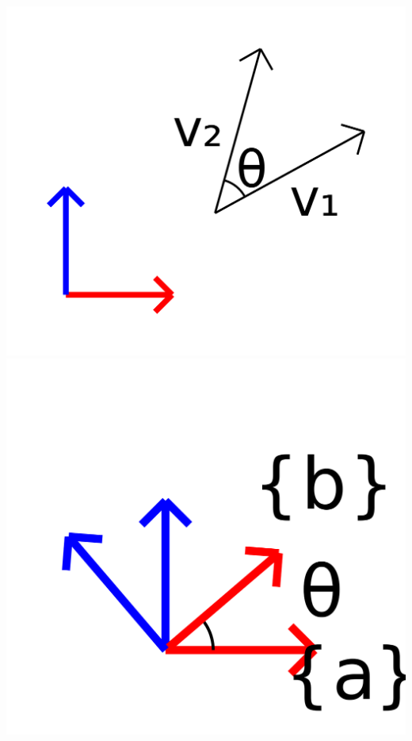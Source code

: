 \documentclass{16384_doc}
\begin{document}
\begin{center}
\includegraphics[scale=0.1]{generated_figures/bg_rotate_vec.png}
\hspace{1in}
\includegraphics[scale=0.1]{generated_figures/bg_rotation.png}
\end{center}
\end{document}
